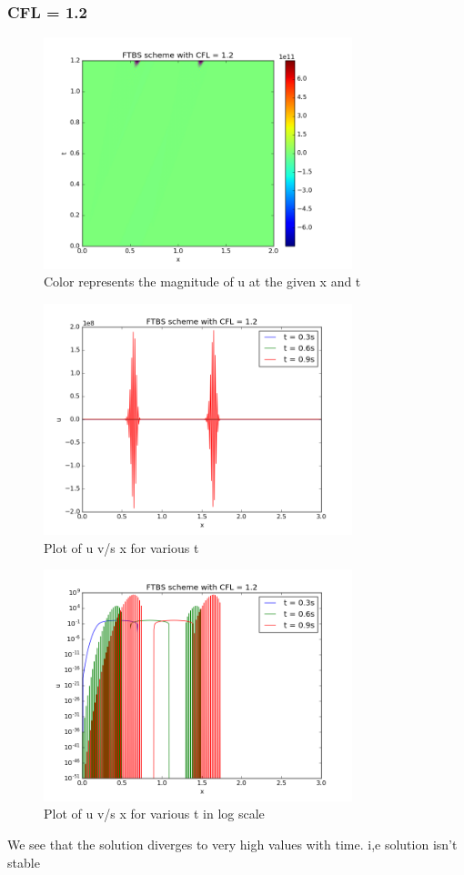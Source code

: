 \documentclass[11pt, a4paper]{article}
\begin{document}
\subsubsection{CFL = 1.2}
\begin{figure}[H]
 \centering
 \includegraphics[width = 0.8\textwidth]{FTBS2_12.png}
 \caption{Color represents the magnitude of u at the given x and t}
\end{figure}

\begin{figure}[H]
 \centering
 \includegraphics[width = 0.8\textwidth]{FTBS2_12_1.png}
 \caption{Plot of u v/s x for various t}
\end{figure}

\begin{figure}[H]
 \centering
 \includegraphics[width = 0.8\textwidth]{FTBS2_12_1_log.png}
 \caption{Plot of u v/s x for various t in log scale}
\end{figure}
We see that the solution diverges to very high values with time. i,e solution isn't stable
\end{document}
